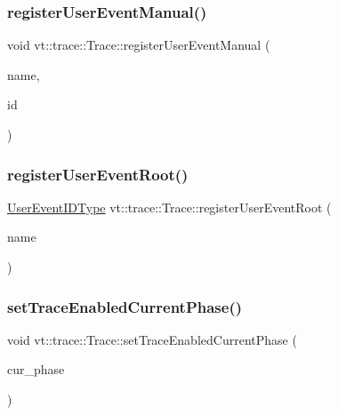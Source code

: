 \mbox{\label{structvt_1_1trace_1_1_trace_ade8d39718f60924f1aeb178ccda56cbc}} 
\subsubsection{\texorpdfstring{register\+User\+Event\+Manual()}{registerUserEventManual()}}
{\footnotesize\ttfamily void vt\+::trace\+::\+Trace\+::register\+User\+Event\+Manual (\begin{DoxyParamCaption}\item[{std\+::string const \&}]{name,  }\item[{\hyperlink{namespacevt_1_1trace_a70c43e0e1596eea236912d4197d3120a}{User\+Spec\+Event\+I\+D\+Type}}]{id }\end{DoxyParamCaption})}

\mbox{\label{structvt_1_1trace_1_1_trace_a99fcca49a5506c3ee5cda67e541e37cc}} 
\subsubsection{\texorpdfstring{register\+User\+Event\+Root()}{registerUserEventRoot()}}
{\footnotesize\ttfamily \hyperlink{namespacevt_1_1trace_a5908920d051c144c89f17c69ed262350}{User\+Event\+I\+D\+Type} vt\+::trace\+::\+Trace\+::register\+User\+Event\+Root (\begin{DoxyParamCaption}\item[{std\+::string const \&}]{name }\end{DoxyParamCaption})}

\mbox{\label{structvt_1_1trace_1_1_trace_aa2740411eec8e1dabf10d60f48193e69}} 
\subsubsection{\texorpdfstring{set\+Trace\+Enabled\+Current\+Phase()}{setTraceEnabledCurrentPhase()}}
{\footnotesize\ttfamily void vt\+::trace\+::\+Trace\+::set\+Trace\+Enabled\+Current\+Phase (\begin{DoxyParamCaption}\item[{\hyperlink{namespacevt_a46ce6733d5cdbd735d561b7b4029f6d7}{Phase\+Type}}]{cur\+\_\+phase }\end{DoxyParamCaption})}

